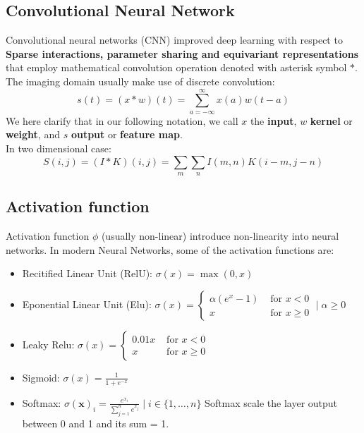 \subsection{Convolutional Neural Network}
Convolutional neural networks (CNN) improved deep learning with respect to \textbf{Sparse interactions, parameter sharing and equivariant representations} that employ mathematical convolution operation denoted with asterisk symbol $*$. The imaging domain usually make use of discrete convolution: $$s(t)=(x * w)(t)=\sum_{a=-\infty}^{\infty} x(a) w(t-a)$$
We here clarify that in our following notation, we call $x$ the \textbf{input}, $w$ \textbf{kernel} or \textbf{weight}, and $s$ \textbf{output} or \textbf{feature map}.\\
In two dimensional case:
$$S(i, j)=(I * K)(i, j)=\sum_{m} \sum_{n} I(m, n) K(i-m, j-n)$$
\subsection{Activation function}
Activation function $\phi$ (usually non-linear) introduce non-linearity into neural networks.
In modern Neural Networks, some of the activation functions are:
\begin{itemize}
	\item Recitified Linear Unit (RelU): $\sigma(x)=\max (0, x)$
	\item Eponential Linear Unit (Elu): $\sigma(x)=\left\{\begin{array}{ll}\alpha\left(e^{x}-1\right) & \text { for } x<0 \\ x & \text { for } x \geq 0\end{array} \mid \alpha \geq 0\right.$
	\item Leaky Relu: $\sigma(x)=\left\{\begin{array}{ll}0.01 x & \text { for } x<0 \\ x & \text { for } x \geq 0\end{array}\right.$
	\item Sigmoid: $\sigma(x)=\frac{1}{1+e^{-x}}$
	\item Softmax: $\sigma(\boldsymbol{x})_{i}=\frac{e^{x_{i}}}{\sum_{j=1}^{n} e^{x_{j}}} \mid i \in\{1, \ldots, n\}$ Softmax scale the layer output between 0 and 1 and its sum = 1.
\end{itemize}

